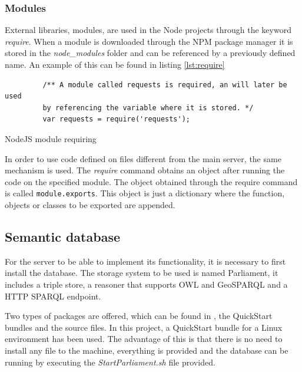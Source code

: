 \subsubsection*{Modules}

External libraries, modules, are used in the Node projects through the keyword \textit{require}. When a module is downloaded through the NPM package manager it is stored in the \textit{node\_modules} folder and can be referenced by a previously defined name. An example of this can be found in listing \ref{lst:require}

\begin{listing}[ht]\centering
  \begin{minipage}{.6\textwidth}
    \begin{verbatim}
         /** A module called requests is required, an will later be used
         by referencing the variable where it is stored. */
	     var requests = require('requests');
    \end{verbatim}
  \end{minipage}
  \caption{NodeJS module requiring}\label{lst:require}
\end{listing}

In order to use code defined on files different from the main server, the same mechanism is used. The \textit{require} command obtains an object after running the code on the specified module. The object obtained through the require command is called \texttt{module.exports}. This object is just a dictionary where the function, objects or classes to be exported are appended.

\subsection{Semantic database}

For the server to be able to implement its functionality, it is necessary to first install the database. The storage system to be used is named Parliament, it includes a triple store, a reasoner that supports OWL and GeoSPARQL and a HTTP SPARQL endpoint. 

Two types of packages are offered, which can be found in \href{http://semwebcentral.org/frs/?group_id=159}, the QuickStart bundles and the source files. In this project, a QuickStart bundle for a Linux environment has been used. The advantage of this is that there is no need to install any file to the machine, everything is provided and the database can be running by executing the \textit{StartParliament.sh} file provided.

